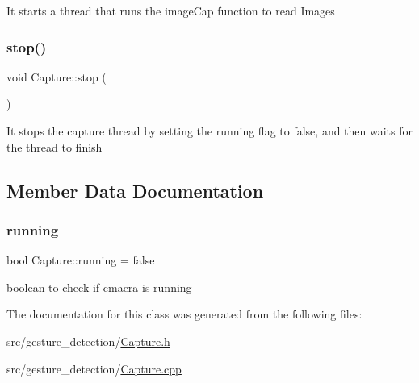 It starts a thread that runs the image\+Cap function to read Images \mbox{\label{classCapture_ab632f1927461a909b18cce71ec96f76d}} 
\subsubsection{\texorpdfstring{stop()}{stop()}}
{\footnotesize\ttfamily void Capture\+::stop (\begin{DoxyParamCaption}{ }\end{DoxyParamCaption})}

It stops the capture thread by setting the running flag to false, and then waits for the thread to finish 

\subsection{Member Data Documentation}
\mbox{\label{classCapture_a4120483ac2f664e14a80ec5dcd9915cb}} 
\subsubsection{\texorpdfstring{running}{running}}
{\footnotesize\ttfamily bool Capture\+::running = false}



boolean to check if cmaera is running 



The documentation for this class was generated from the following files\+:\begin{DoxyCompactItemize}
\item 
src/gesture\+\_\+detection/\hyperlink{Capture_8h}{Capture.\+h}\item 
src/gesture\+\_\+detection/\hyperlink{Capture_8cpp}{Capture.\+cpp}\end{DoxyCompactItemize}

